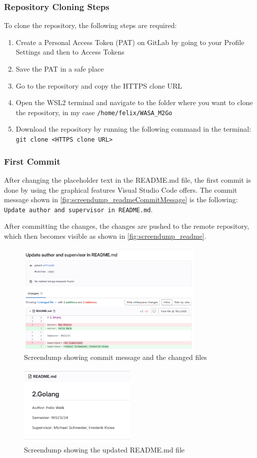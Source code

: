 \subsubsection*{Repository Cloning Steps}
To clone the repository, the following steps are required:
\begin{enumerate}
    \item Create a Personal Access Token (PAT) on GitLab by going to your Profile Settings and then to Access Tokens
    \item Save the PAT in a safe place
    \item Go to the repository and copy the HTTPS clone URL
    \item Open the WSL2 terminal and navigate to the folder where you want to clone the repository, in my case \texttt{/home/felix/WASA\_M2Go}
    \item Download the repository by running the following command in the terminal: \texttt{git clone <HTTPS clone URL>}
\end{enumerate}

\subsubsection*{First Commit}
After changing the placeholder text in the README.md file, the first commit is done by using the graphical features Visual Studio Code offers.
The commit message shown in \autoref{fig:screendump_readmeCommitMessage} is the following: \texttt{Update author and supervisor in README.md}.

After committing the changes, the changes are pushed to the remote repository, which then becomes visible as shown in \autoref{fig:screendump_readme}.

\begin{figure}[h]
    \centering
    \includegraphics[width=0.8\textwidth]{figures/goLang/golang_screendumpReadmeCommit.png}
    \caption{Screendump showing commit message and the changed files}
    \label{fig:screendump_readmeCommitMessage}
\end{figure}

\begin{figure}[h]
    \centering
    \includegraphics[width=0.5\textwidth]{figures/goLang/golang_screendumpReadme.png}
    \caption{Screendump showing the updated README.md file}
    \label{fig:screendump_readme}
\end{figure}
